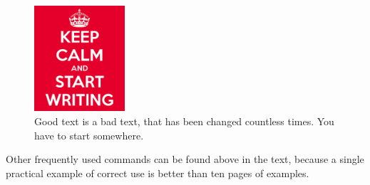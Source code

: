 \begin{figure}[hbt]
	\centering
	\includegraphics[width=0.3\textwidth]{obrazky-figures/keep-calm.png}
	\caption{Good text is a bad text, that has been changed countless times. You have to start somewhere.}
	\label{keepCalm}
\end{figure}

Other frequently used commands can be found above in the text, because a single practical example of correct use is better than ten pages of examples.